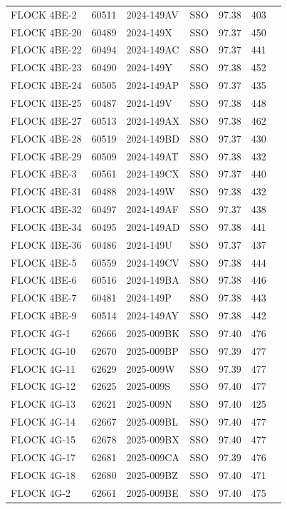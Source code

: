 \begin{longtable}{p{3.5cm}lllccc}
FLOCK 4BE-2 & 60511 & 2024-149AV & SSO & 97.38 & 403 \\
FLOCK 4BE-20 & 60489 & 2024-149X & SSO & 97.37 & 450 \\
FLOCK 4BE-22 & 60494 & 2024-149AC & SSO & 97.37 & 441 \\
FLOCK 4BE-23 & 60490 & 2024-149Y & SSO & 97.38 & 452 \\
FLOCK 4BE-24 & 60505 & 2024-149AP & SSO & 97.37 & 435 \\
FLOCK 4BE-25 & 60487 & 2024-149V & SSO & 97.38 & 448 \\
FLOCK 4BE-27 & 60513 & 2024-149AX & SSO & 97.38 & 462 \\
FLOCK 4BE-28 & 60519 & 2024-149BD & SSO & 97.37 & 430 \\
FLOCK 4BE-29 & 60509 & 2024-149AT & SSO & 97.38 & 432 \\
FLOCK 4BE-3 & 60561 & 2024-149CX & SSO & 97.37 & 440 \\
FLOCK 4BE-31 & 60488 & 2024-149W & SSO & 97.38 & 432 \\
FLOCK 4BE-32 & 60497 & 2024-149AF & SSO & 97.37 & 438 \\
FLOCK 4BE-34 & 60495 & 2024-149AD & SSO & 97.38 & 441 \\
FLOCK 4BE-36 & 60486 & 2024-149U & SSO & 97.37 & 437 \\
FLOCK 4BE-5 & 60559 & 2024-149CV & SSO & 97.38 & 444 \\
FLOCK 4BE-6 & 60516 & 2024-149BA & SSO & 97.38 & 446 \\
FLOCK 4BE-7 & 60481 & 2024-149P & SSO & 97.38 & 443 \\
FLOCK 4BE-9 & 60514 & 2024-149AY & SSO & 97.38 & 442 \\
FLOCK 4G-1 & 62666 & 2025-009BK & SSO & 97.40 & 476 \\
FLOCK 4G-10 & 62670 & 2025-009BP & SSO & 97.39 & 477 \\
FLOCK 4G-11 & 62629 & 2025-009W & SSO & 97.39 & 477 \\
FLOCK 4G-12 & 62625 & 2025-009S & SSO & 97.40 & 477 \\
FLOCK 4G-13 & 62621 & 2025-009N & SSO & 97.40 & 425 \\
FLOCK 4G-14 & 62667 & 2025-009BL & SSO & 97.40 & 477 \\
FLOCK 4G-15 & 62678 & 2025-009BX & SSO & 97.40 & 477 \\
FLOCK 4G-17 & 62681 & 2025-009CA & SSO & 97.39 & 476 \\
FLOCK 4G-18 & 62680 & 2025-009BZ & SSO & 97.40 & 471 \\
FLOCK 4G-2 & 62661 & 2025-009BE & SSO & 97.40 & 475 \\

\end{longtable}
